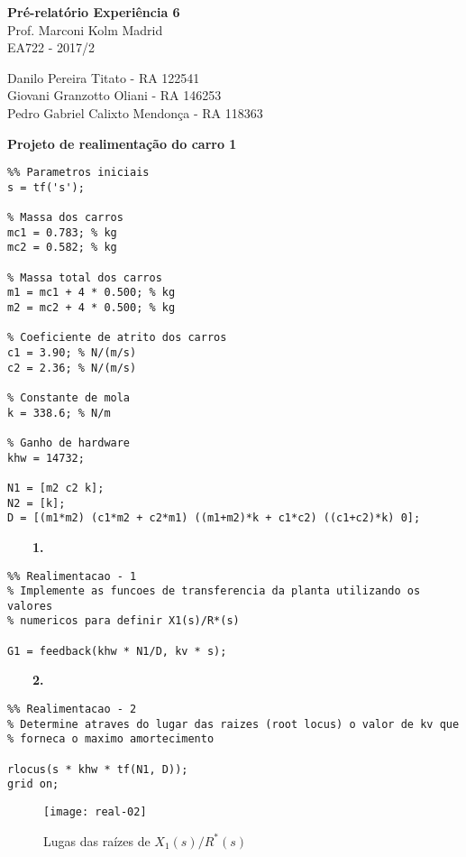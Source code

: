 \documentclass[a4paper,11pt]{article}
\begin{document}
	

\begin{center}
\textbf{Pré-relatório Experiência 6} \\
\hspace{5pt}
Prof. Marconi Kolm Madrid \\
EA722 - 2017/2
\end{center}

\begin{center}
Danilo Pereira Titato - RA 122541 \\
Giovani Granzotto Oliani - RA 146253 \\
Pedro Gabriel Calixto Mendonça - RA 118363
\end{center}

\textbf{Projeto de realimentação do carro 1}

\begin{lstlisting}
%% Parametros iniciais
s = tf('s');

% Massa dos carros
mc1 = 0.783; % kg
mc2 = 0.582; % kg

% Massa total dos carros
m1 = mc1 + 4 * 0.500; % kg
m2 = mc2 + 4 * 0.500; % kg

% Coeficiente de atrito dos carros
c1 = 3.90; % N/(m/s)
c2 = 2.36; % N/(m/s)

% Constante de mola
k = 338.6; % N/m

% Ganho de hardware
khw = 14732;

N1 = [m2 c2 k];
N2 = [k];
D = [(m1*m2) (c1*m2 + c2*m1) ((m1+m2)*k + c1*c2) ((c1+c2)*k) 0];
\end{lstlisting}

~~~~\textbf{1.}

\begin{lstlisting}
%% Realimentacao - 1
% Implemente as funcoes de transferencia da planta utilizando os valores
% numericos para definir X1(s)/R*(s)

G1 = feedback(khw * N1/D, kv * s);
\end{lstlisting}

~~~~\textbf{2.}

\begin{lstlisting}
%% Realimentacao - 2
% Determine atraves do lugar das raizes (root locus) o valor de kv que
% forneca o maximo amortecimento

rlocus(s * khw * tf(N1, D));
grid on;
\end{lstlisting}

\begin{figure}[H]
\centering
\texttt{[image: real-02]}
\caption{Lugas das raízes de $X_1\left(s\right)/R^\ast\left(s\right)$}
\end{figure}
\end{document}
